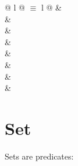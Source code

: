 \begin{isabellebody}
\begin{isamarkuptext}
\begin{supertabular}{@ {} l @ {\quad$\equiv$\quad} l @ {}}
 & \\
 & \\
 & \\
 & \\
 & \\
 & \\
\isa{{\isachardoublequote}{\isasymtop}{\isachardoublequote}} & \\
\isa{{\isachardoublequote}{\isasymbottom}{\isachardoublequote}} & \\
\end{supertabular}


\section{Set}

Sets are predicates: 
\bigskip


\end{isamarkuptext}
\end{isabellebody}
